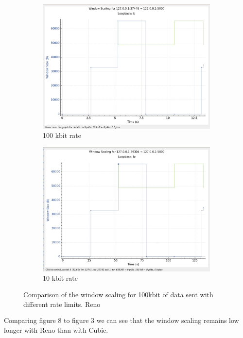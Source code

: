 \documentclass{report}
\begin{document}
\begin{figure}[H]
    \begin{subfigure}[b]{0.45\textwidth}
        \centering
        \includegraphics[width=\textwidth]{Pics/Reno/r100kbit_s100k_ws}
        \caption{100 kbit rate}
    \end{subfigure}
    \hfill
    \begin{subfigure}[b]{0.45\textwidth}
        \centering
        \includegraphics[width=\textwidth]{Pics/Reno/r10kbit_s100k_ws}
        \caption{10 kbit rate}
    \end{subfigure}
    \caption{Comparison of the window scaling for 100kbit of data sent with different rate limits. Reno}
    \label{fig:four_images}
\end{figure}
Comparing figure 8 to figure 3 we can see that the window scaling remains low longer with Reno than with Cubic.\\
\end{document}
